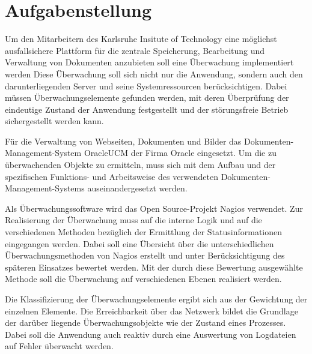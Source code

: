 \section{Aufgabenstellung}

Um den Mitarbeitern des Karlsruhe Insitute of Technology eine möglichst ausfallsichere Plattform für die zentrale Speicherung, Bearbeitung und Verwaltung von Dokumenten anzubieten soll eine Überwachung implementiert werden
Diese Überwachung soll sich nicht nur die Anwendung, sondern auch den darunterliegenden Server und seine Systemressourcen berücksichtigen.
Dabei müssen Überwachungselemente gefunden werden, mit deren Überprüfung der eindeutige Zustand der Anwendung festgestellt und der störungsfreie Betrieb sichergestellt werden kann.

Für die Verwaltung von Webseiten, Dokumenten und Bilder das Dokumenten-Management-System \gls{OracleUCM} der Firma Oracle eingesetzt.
Um die zu überwachenden Objekte zu ermitteln, muss sich mit dem Aufbau und der spezifischen Funktions- und Arbeitsweise des verwendeten Dokumenten-Management-Systems auseinandergesetzt werden.

Als Überwachungssoftware wird das Open Source-Projekt Nagios verwendet.
Zur Realisierung der Überwachung muss auf die interne Logik und auf die verschiedenen Methoden bezüglich der Ermittlung der Statusinformationen eingegangen werden.
Dabei soll eine Übersicht über die unterschiedlichen Überwachungsmethoden von Nagios erstellt und unter Berücksichtigung des späteren Einsatzes bewertet werden.
Mit der durch diese Bewertung ausgewählte Methode soll die Überwachung auf verschiedenen Ebenen realisiert werden.

Die Klassifizierung der Überwachungselemente ergibt sich aus der Gewichtung der einzelnen Elemente.
Die Erreichbarkeit über das Netzwerk bildet die Grundlage der darüber liegende Überwachungsobjekte wie der Zustand eines Prozesses.
Dabei soll die Anwendung auch reaktiv durch eine Auswertung von Logdateien auf Fehler überwacht werden.


